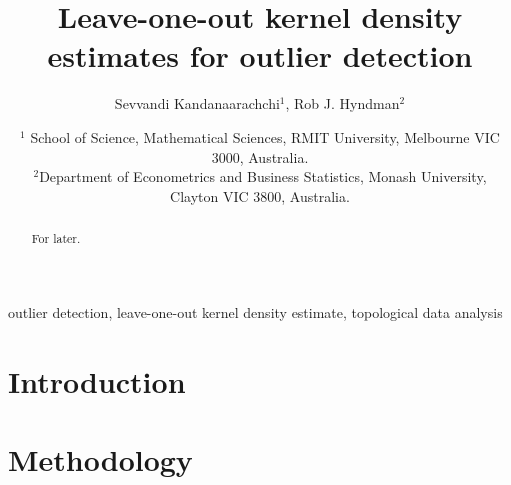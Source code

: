 \documentclass[letter,12pt]{article}
\begin{document}


\title{Leave-one-out kernel density estimates for outlier detection}
\author{Sevvandi Kandanaarachchi$^1$, Rob J. Hyndman$^2$}
\date{%
   \scriptsize{ $^1$ School of Science,  Mathematical Sciences, RMIT University, Melbourne VIC 3000, Australia.\\ 
   $^2$Department of Econometrics and Business Statistics, Monash University, Clayton VIC 3800, Australia.\\ [2ex]}%
    }
\begin{titlingpage}
\maketitle

\begin{abstract}
For later. 
\end{abstract}

\begin{keywords}outlier detection, leave-one-out kernel density estimate, topological data analysis
\end{keywords}

\end{titlingpage}

\section{Introduction}\label{sec:introduction}
\section{Methodology}\label{sec:methodology}
\end{document}
